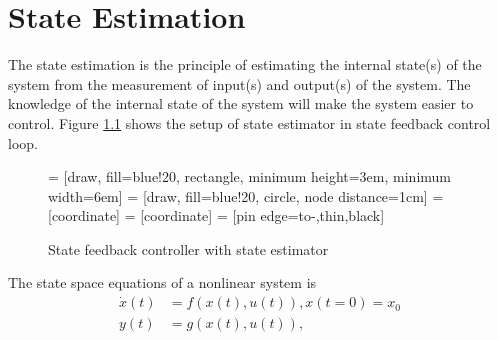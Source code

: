 \chapter{State Estimation}
\label{ch:st_est}
The state estimation is the principle of estimating the internal state(s) of the system from the measurement of input(s) and output(s) of the system. The knowledge of the internal state of the system will make the system easier to control. Figure \ref{fig:observer} shows the setup of state estimator in state feedback control loop.
\begin{figure}[h]
 = [draw, fill=blue!20, rectangle, 
    minimum height=3em, minimum width=6em]
 = [draw, fill=blue!20, circle, node distance=1cm]
 = [coordinate]
 = [coordinate]
 = [pin edge={to-,thin,black}]
\def\blockdist{2.3}
    \caption{State feedback controller with state estimator}
      \label{fig:observer}
\end{figure}

The state space equations of a nonlinear system is
\begin{equation}
\begin{split}
\label{eqn:nl_sys}
\dot{x}(t) &= f(x(t),u(t)) , x(t=0) = x_0 \\
y(t) &= g(x(t),u(t)),
\end{split}
\end{equation}

